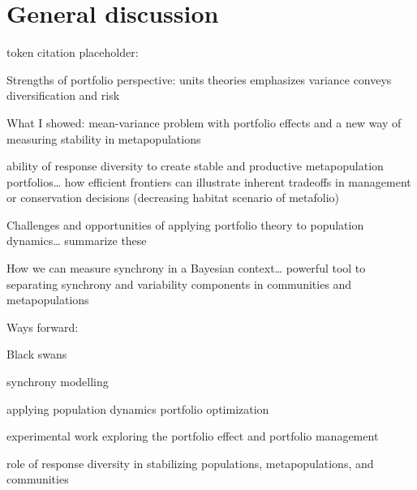 \chapter{General discussion}

token citation placeholder: \citep{anderson2014}

Strengths of portfolio perspective: units theories emphasizes variance conveys diversification and risk

What I showed: mean-variance problem with portfolio effects and a new way of measuring stability in metapopulations

ability of response diversity to create stable and productive metapopulation portfolios\ldots{} how efficient frontiers can illustrate inherent tradeoffs in management or conservation decisions (decreasing habitat scenario of metafolio)

Challenges and opportunities of applying portfolio theory to population dynamics\ldots{} summarize these

How we can measure synchrony in a Bayesian context\ldots{} powerful tool to separating synchrony and variability components in communities and metapopulations

Ways forward:

Black swans

synchrony modelling

applying population dynamics portfolio optimization

experimental work exploring the portfolio effect and portfolio management

role of response diversity in stabilizing populations, metapopulations, and communities


